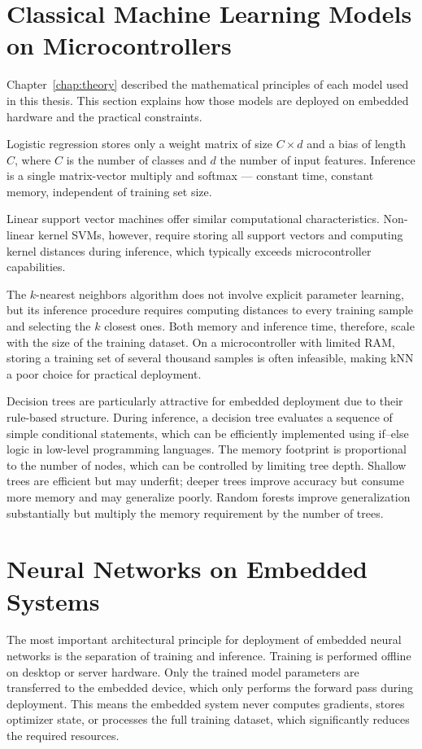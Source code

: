 \section{Classical Machine Learning Models on Microcontrollers}
\label{sec:emb_cl_model}
Chapter~\ref{chap:theory} described the mathematical principles of each model used in this thesis. This section explains how those models are deployed on embedded hardware and the practical constraints.

Logistic regression stores only a weight matrix of size $C \times d$ and a bias of length $C$, where $C$ is the number of classes and $d$ the number of input features. Inference is a single matrix-vector multiply and softmax — constant time, constant memory, independent of training set size.

Linear support vector machines offer similar computational characteristics. Non-linear kernel SVMs, however, require storing all support vectors and computing kernel distances during inference, which typically exceeds microcontroller capabilities.

The $k$-nearest neighbors algorithm does not involve explicit parameter learning, but its inference procedure requires computing distances to every training sample and selecting the $k$ closest ones. Both memory and inference time, therefore, scale with the size of the training dataset. On a microcontroller with limited RAM, storing a training set of several thousand samples is often infeasible, making kNN a poor choice for practical deployment.

Decision trees are particularly attractive for embedded deployment due to their rule-based structure. During inference, a decision tree evaluates a sequence of simple conditional statements, which can be efficiently implemented using if--else logic in low-level programming languages. The memory footprint is proportional to the number of nodes, which can be controlled by limiting tree depth. Shallow trees are efficient but may underfit; deeper trees improve accuracy but consume more memory and may generalize poorly.
Random forests improve generalization substantially but multiply the memory requirement by the number of trees.

\section{Neural Networks on Embedded Systems}
The most important architectural principle for deployment of embedded neural networks is the separation of training and inference. Training is performed offline on desktop or server hardware. Only the trained model parameters are transferred to the embedded device, which only performs the forward pass during deployment. This means the embedded system never computes gradients, stores optimizer state, or processes the full training dataset, which significantly reduces the required resources.

